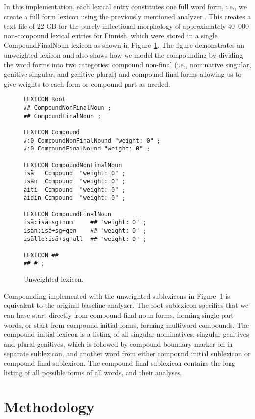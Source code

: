 \documentclass[postprint]{flammie}
\begin{document}
In this implementation, each lexical entry constitutes one full word
form, i.e., we create a full form lexicon using the previously
mentioned analyzer \cite{pirinen/2008}. This creates a text file of 22
GB for the purely inflectional morphology of approximately 40~000
non-compound lexical entries for Finnish, which were stored in a
single CompoundFinalNoun lexicon as shown in
Figure~\ref{fig:unweighted}. The figure demonstrates an unweighted
lexicon and also shows how we model the compounding by dividing the
word forms into two categories: compound non-final (i.e., nominative
singular, genitive singular, and genitive plural) and compound final
forms allowing us to give weights to each form or compound part as
needed.

\begin{figure}[htb]
\begin{small}
\begin{verbatim}
LEXICON Root
## CompoundNonFinalNoun ;
## CompoundFinalNoun ;

LEXICON Compound
#:0 CompoundNonFinalNound "weight: 0" ;
#:0 CompoundFinalNound "weight: 0" ;

LEXICON CompoundNonFinalNoun
isä   Compound  "weight: 0" ;
isän  Compound  "weight: 0" ;
äiti  Compound  "weight: 0" ;
äidin Compound  "weight: 0" ;

LEXICON CompoundFinalNoun
isä:isä+sg+nom     ## "weight: 0" ;
isän:isä+sg+gen    ## "weight: 0" ;
isälle:isä+sg+all  ## "weight: 0" ;

LEXICON ##
## # ;
\end{verbatim}
\caption{Unweighted lexicon.
}\label{fig:unweighted}
\end{small}
\end{figure}

Compounding implemented with the unweighted sublexicons in
Figure~\ref{fig:unweighted} is equivalent to the original baseline
analyzer. The root sublexicon specifies that we can have start directly
from compound final noun forms, forming single part words, or start from
compound initial forms, forming multiword compounds. The compound initial
lexicon is a listing of all singular nominatives, singular genitives and
plural genitives, which is followed by compound boundary marker on in separate
sublexicon, and another word from either compound initial sublexicon or compound
final sublexicon. The compound final sublexicon contains the long listing of all
possible forms of all words, and their analyses, 

\section{Methodology}  
\label{Sect3}
\end{document}
